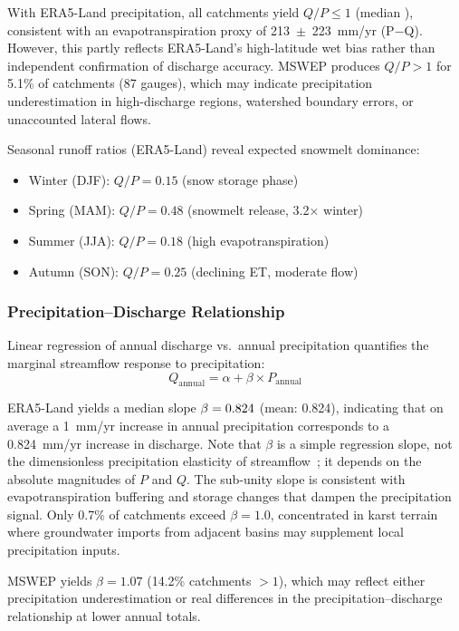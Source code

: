 With ERA5-Land precipitation, all catchments yield $Q/P \leq 1$ (median \medianrunoffratio), consistent with an evapotranspiration proxy of 213~$\pm$~223~mm/yr (P$-$Q).
However, this partly reflects ERA5-Land's high-latitude wet bias rather than independent confirmation of discharge accuracy.
MSWEP produces $Q/P > 1$ for 5.1\% of catchments (87 gauges), which may indicate precipitation underestimation in high-discharge regions, watershed boundary errors, or unaccounted lateral flows.

Seasonal runoff ratios (ERA5-Land) reveal expected snowmelt dominance:
\begin{itemize}
    \item Winter (DJF): $Q/P = 0.15$ (snow storage phase)
    \item Spring (MAM): $Q/P = 0.48$ (snowmelt release, 3.2$\times$ winter)
    \item Summer (JJA): $Q/P = 0.18$ (high evapotranspiration)
    \item Autumn (SON): $Q/P = 0.25$ (declining ET, moderate flow)
\end{itemize}

\subsubsection{Precipitation--Discharge Relationship}
Linear regression of annual discharge vs.\ annual precipitation quantifies the marginal streamflow response to precipitation:
\begin{equation}
Q_{\text{annual}} = \alpha + \beta \times P_{\text{annual}}
\end{equation}

ERA5-Land yields a median slope $\beta = 0.824$ (mean: 0.824), indicating that on average a 1~mm/yr increase in annual precipitation corresponds to a 0.824~mm/yr increase in discharge.
Note that $\beta$ is a simple regression slope, not the dimensionless precipitation elasticity of streamflow~\citep{Sankarasubramanian2001}; it depends on the absolute magnitudes of $P$ and $Q$.
The sub-unity slope is consistent with evapotranspiration buffering and storage changes that dampen the precipitation signal.
Only 0.7\% of catchments exceed $\beta = 1.0$, concentrated in karst terrain where groundwater imports from adjacent basins may supplement local precipitation inputs.

MSWEP yields $\beta = 1.07$ (14.2\% catchments $> 1$), which may reflect either precipitation underestimation or real differences in the precipitation--discharge relationship at lower annual totals.

